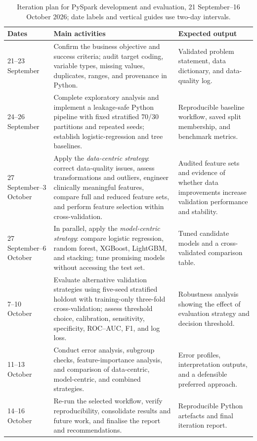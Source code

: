 \begin{table}[htbp]
\centering
\caption{Iteration plan for PySpark development and evaluation, 21 September--16 October 2026; date labels and vertical guides use two-day intervals.}
\label{tab:iteration-plan}
\begin{tabularx}{\textwidth}{p{2.7cm} X X}
\toprule
\textbf{Dates} & \textbf{Main activities} & \textbf{Expected output} \\
\midrule
21--23 September & Confirm the business objective and success criteria; audit target coding, variable types, missing values, duplicates, ranges, and provenance in Python. & Validated problem statement, data dictionary, and data-quality log. \\
24--26 September & Complete exploratory analysis and implement a leakage-safe Python pipeline with fixed stratified 70/30 partitions and repeated seeds; establish logistic-regression and tree baselines. & Reproducible baseline workflow, saved split membership, and benchmark metrics. \\
27 September--3 October & Apply the \emph{data-centric strategy}: correct data-quality issues, assess transformations and outliers, engineer clinically meaningful features, compare full and reduced feature sets, and perform feature selection within cross-validation. & Audited feature sets and evidence of whether data improvements increase validation performance and stability. \\
27 September--6 October & In parallel, apply the \emph{model-centric strategy}: compare logistic regression, random forest, XGBoost, LightGBM, and stacking; tune promising models without accessing the test set. & Tuned candidate models and a cross-validated comparison table. \\
7--10 October & Evaluate alternative validation strategies using five-seed stratified holdout with training-only three-fold cross-validation; assess threshold choice, calibration, sensitivity, specificity, ROC--AUC, F1, and log loss. & Robustness analysis showing the effect of evaluation strategy and decision threshold. \\
11--13 October & Conduct error analysis, subgroup checks, feature-importance analysis, and comparison of data-centric, model-centric, and combined strategies. & Error profiles, interpretation outputs, and a defensible preferred approach. \\
14--16 October & Re-run the selected workflow, verify reproducibility, consolidate results and future work, and finalise the report and recommendations. & Reproducible Python artefacts and final iteration report. \\
\bottomrule
\end{tabularx}
\end{table}

